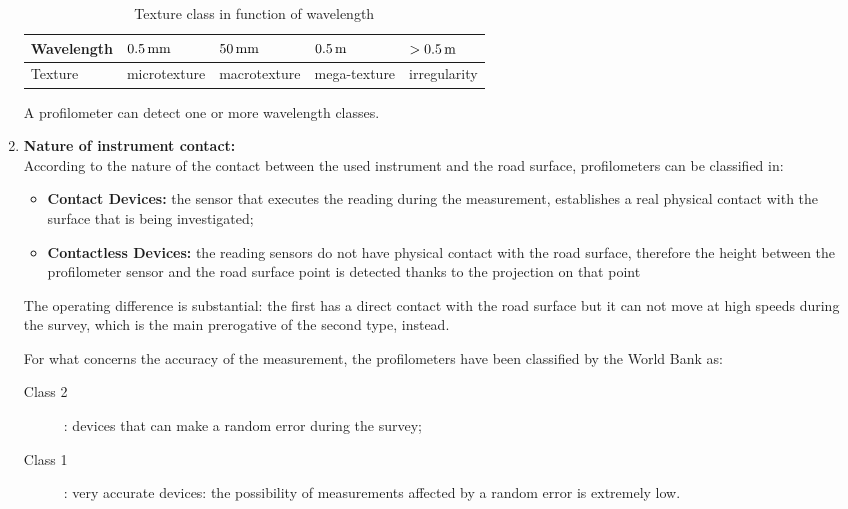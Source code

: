 \documentclass[tesi]{subfiles}
\begin{document}
\begin{enumerate}
\begin{table}[ht]
\centering
    \begin{tabular}{ | l | l | l | l | l |}

    \hline
    Wavelength & \quad $\num{0.5} \thinspace \si{\milli\meter}$ & \quad $\num{50} \thinspace \si{\milli\meter}$ & \quad $\num{0.5}\thinspace \si{\meter}$ & $ > \num{0.5} \thinspace \si{\meter} $  \\ \hline
   \quad  Texture & microtexture& macrotexture &mega-texture &	irregularity \\

\hline
    \end{tabular}
 \caption{Texture class in function of wavelength}
\end{table}
A profilometer can detect one or more wavelength classes.

\item \textbf{Nature of instrument contact:}\label{ssc:Instrument_Contact}\leavevmode\\
According to the nature of the contact between the used instrument and the road surface, profilometers can be classified in:
\begin{itemize}
\item \textbf{Contact Devices:} the sensor that executes the reading during the measurement, establishes a real physical contact with the surface that is being investigated;

\item \textbf{Contactless Devices:} the reading sensors do not have physical contact with the road surface, therefore the height between the profilometer sensor and the road surface point is detected thanks to the projection on that point
\end{itemize}
The operating difference is substantial: the first has a direct contact with the road surface but it can not move at high speeds during the survey, which is the main prerogative of the second type, instead. 

For what concerns the accuracy of the measurement, the profilometers have been classified by the World Bank\cite{sayers1995calculation} as:
\begin{description}

	\item [Class 2]: devices that can make a random error during the survey;
	\item [Class 1]: very accurate devices: the possibility of measurements affected by a random error is extremely low.


\end{description}
\end{enumerate}
\end{document}
